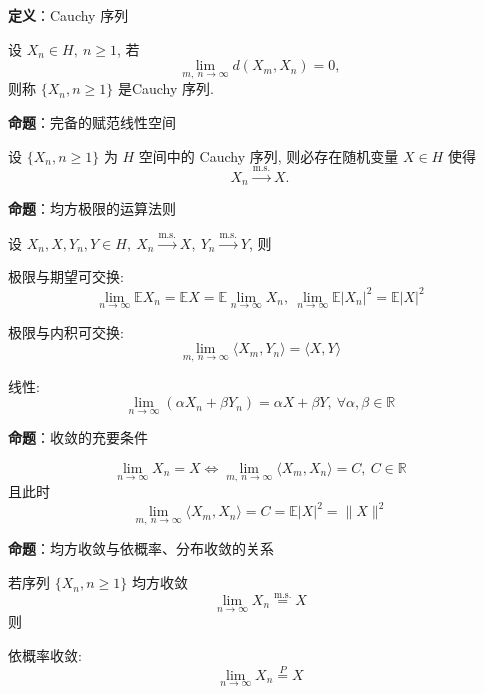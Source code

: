 \documentclass[openany]{ctexbook}
\theoremstyle{kaiti}
\theoremstyle{normal}
\begin{document}
\textbf{定义}：Cauchy 序列

设 $X_n\in H,~n\geqslant1$, 若
\begin{equation}
  \lim_{m,~n\to\infty}d(X_m,X_n)=0,
\end{equation}
 则称 $\{X_n,n\geqslant1\}$ 是Cauchy 序列.

\textbf{命题}：完备的赋范线性空间

设 $\{X_n,n\geqslant1\}$ 为 $H$ 空间中的 Cauchy 序列, 则必存在随机变量 $X\in H$ 使得
\begin{equation}
  X_n\overset{\mathrm{m.s.}}{\rightarrow}X.
\end{equation}


\textbf{命题}：均方极限的运算法则

设 $X_n,X,Y_n,Y\in H,~X_n\overset{\mathrm{m.s.}}{\rightarrow}X,~Y_n\overset{\mathrm{m.s.}}{\rightarrow}Y$, 则

极限与期望可交换:
\begin{equation}
  \lim_{n\to\infty}\mathbb{E}X_n=\mathbb{E}X=\mathbb{E}\lim_{n\to\infty}X_n,~\lim_{n\to\infty}\mathbb{E}|X_n|^2=\mathbb{E}|X|^2
\end{equation}


极限与内积可交换:
\begin{equation}
  \lim_{m,~n\to\infty}\langle X_m,Y_n\rangle=\langle X,Y\rangle
\end{equation}


线性:
\begin{equation}
  \lim_{n\to\infty}(\alpha X_n+\beta Y_n)=\alpha X+\beta Y,~\forall \alpha,\beta\in\mathbb{R}
\end{equation}


\textbf{命题}：收敛的充要条件

\begin{equation}\lim_{n\to\infty}X_n=X\Leftrightarrow\lim_{m,~n\to\infty}\langle X_m,X_n\rangle=C,~C\in\mathbb{R}\end{equation} 且此时
\begin{equation}
  \lim_{m,~n\to\infty}\langle X_m,X_n\rangle=C=\mathbb{E}|X|^2=\|X\|^2
\end{equation}


\textbf{命题}：均方收敛与依概率、分布收敛的关系

若序列 $\{X_n,n\geqslant1\}$ 均方收敛
\begin{equation}
  \lim_{n\to\infty}X_n\overset{\mathrm{m.s.}}{=}X
\end{equation}
 则

依概率收敛:
\begin{equation}
  \lim_{n\to\infty}X_n\overset{P}{=}X
\end{equation}
\end{document}

